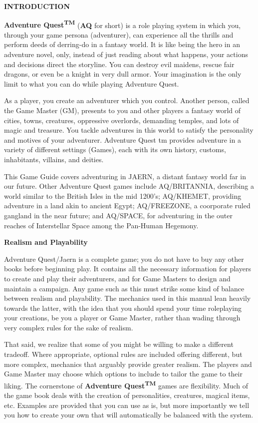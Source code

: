 \textbf{INTRODUCTION}

\textbf{Adventure Quest\textsuperscript{TM}} (\textbf{AQ} for short) is a role playing system in which you, through your game persona (adventurer), can experience all the thrills and perform deeds of derring-do in a fantasy world. It is like being the hero in an adventure novel, only, instead of just reading about what happens, your actions and decisions direct the storyline. You can destroy evil maidens, rescue fair dragons, or even be a knight in very dull armor. Your imagination is the only limit to what you can do while playing Adventure Quest.

As a player, you create an adventurer which you control. Another person, called the Game Master (GM), presents to you and other players a fantasy world of cities, towns, creatures, oppressive overlords, demanding temples, and lots of magic and treasure. You tackle adventures in this world to satisfy the personality and motives of your adventurer. Adventure Quest tm provides adventure in a variety of different settings (Games), each with its own history, customs, inhabitants, villains, and deities. 

This Game Guide covers adventuring in JAERN, a distant fantasy world far in our future. Other Adventure Quest games include AQ/BRITANNIA, describing a world similar to the British Isles in the mid 1200’s; AQ/KHEMET, providing adventure in a land akin to ancient Egypt; AQ/FREEZONE, a coorporate ruled gangland in the near future; and AQ/SPACE, for adventuring in the outer reaches of Interstellar Space among the Pan-Human Hegemony.

\textbf{Realism and Playability}

Adventure Quest/Jaern is a complete game; you do not have to buy any other books before beginning play. It contains all the necessary information for players to create and play their adventurers, and for Game Masters to design and maintain a campaign. Any game such as this must strike some kind of balance between realism and playability. The mechanics used in this manual lean heavily towards the latter, with the idea that you should spend your time roleplaying your creations, be you a player or Game Master, rather than wading through very complex rules for the sake of realism.

That said, we realize that some of you might be willing to make a different tradeoff. Where appropriate, optional rules are included offering different, but more complex, mechanics that arguably provide greater realism. The players and Game Master may choose which options to include to tailor the game to their liking. The cornerstone of \textbf{Adventure Quest\textsuperscript{TM}} games are flexibility. Much of the game book deals with the creation of personalities, creatures, magical items, etc. Examples are provided that you can use as is, but more importantly we tell you how to create your own that will automatically be balanced with the system.

